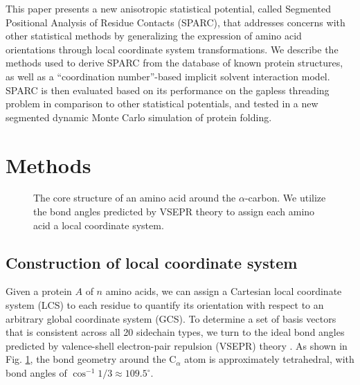 \documentclass[11pt]{article}
\begin{document}
This paper presents a new anisotropic statistical potential, called Segmented Positional Analysis of Residue Contacts (SPARC), that addresses concerns with other statistical methods by generalizing the expression of amino acid orientations through local coordinate system transformations.
We describe the methods used to derive SPARC from the database of known protein structures, as well as a ``coordination number''-based implicit solvent interaction model.
SPARC is then evaluated based on its performance on the gapless threading problem in comparison to other statistical potentials, and tested in a new segmented dynamic Monte Carlo simulation of protein folding.

\section{Methods}

\begin{figure}
	\begin{center}
	\end{center}
	\caption{The core structure of an amino acid around the $\alpha$-carbon. We utilize the bond angles predicted by VSEPR theory to assign each amino acid a local coordinate system.}
	\label{aminoacid_axes}
\end{figure}

\subsection{Construction of local coordinate system}
Given a protein $A$ of $n$ amino acids, we can assign a Cartesian local coordinate system (LCS) to each residue to quantify its orientation with respect to an arbitrary global coordinate system (GCS).
To determine a set of basis vectors that is consistent across all 20 sidechain types, we turn to the ideal bond angles predicted by valence-shell electron-pair repulsion (VSEPR) theory \cite{gillespie}.
As shown in Fig. \ref{aminoacid_axes}, the bond geometry around the C$_\alpha$ atom is approximately tetrahedral, with bond angles of $\cos^{-1}{1/3}\approx 109.5^\circ$.
\end{document}
